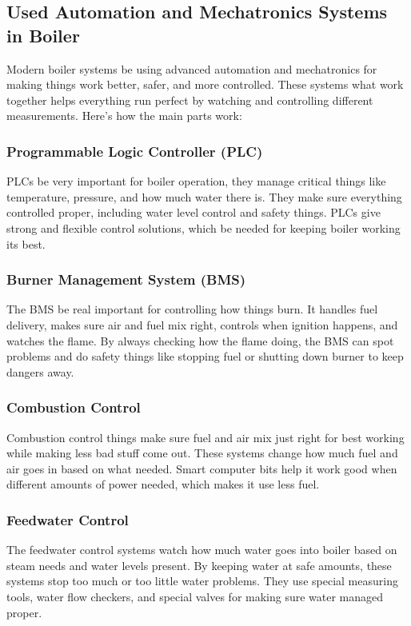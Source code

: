 \subsection{Used Automation and Mechatronics Systems in Boiler}
Modern boiler systems be using advanced automation and mechatronics for making things work better, safer, and more controlled. These systems what work together helps everything run perfect by watching and controlling different measurements. Here's how the main parts work:

\subsubsection{Programmable Logic Controller (PLC)}
PLCs be very important for boiler operation, they manage critical things like temperature, pressure, and how much water there is. They make sure everything controlled proper, including water level control and safety things. PLCs give strong and flexible control solutions, which be needed for keeping boiler working its best.

\subsubsection{Burner Management System (BMS)}
The BMS be real important for controlling how things burn. It handles fuel delivery, makes sure air and fuel mix right, controls when ignition happens, and watches the flame. By always checking how the flame doing, the BMS can spot problems and do safety things like stopping fuel or shutting down burner to keep dangers away.

\subsubsection{Combustion Control}
Combustion control things make sure fuel and air mix just right for best working while making less bad stuff come out. These systems change how much fuel and air goes in based on what needed. Smart computer bits help it work good when different amounts of power needed, which makes it use less fuel.

\subsubsection{Feedwater Control}
The feedwater control systems watch how much water goes into boiler based on steam needs and water levels present. By keeping water at safe amounts, these systems stop too much or too little water problems. They use special measuring tools, water flow checkers, and special valves for making sure water managed proper.

